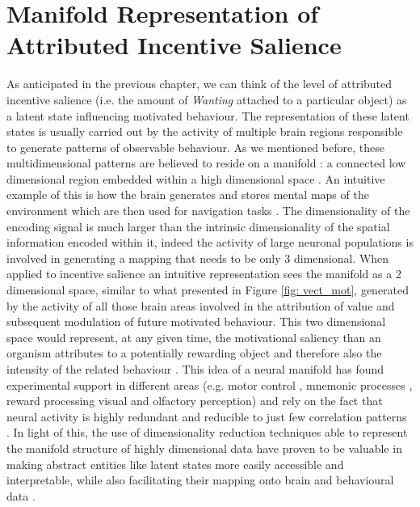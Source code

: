 \section{Manifold Representation of Attributed Incentive Salience}
As anticipated in the previous chapter, we can think of the level of attributed incentive salience (i.e. the amount of \textit{Wanting} attached to a particular object) as a latent state influencing motivated behaviour. The representation of these latent states is usually carried out by the activity of multiple brain regions responsible to generate patterns of observable behaviour. As we mentioned before, these multidimensional patterns are believed to reside on a manifold \cite{seung2000manifold, pang2016dimensionality}: a connected low dimensional region embedded within a high dimensional space \cite{bengio2017deep}. An intuitive example of this is how the brain generates and stores mental maps of the environment which are then used for navigation tasks \cite{derdikman2011manifold, nieh2021geometry}. The dimensionality of the encoding signal is much larger than the intrinsic dimensionality of the spatial information encoded within it, indeed the activity of large neuronal populations is involved in generating a mapping that needs to be only 3 dimensional. When applied to incentive salience an intuitive representation sees the manifold as a 2 dimensional space, similar to what presented in Figure \ref{fig: vect_mot}, generated by the activity of all those brain areas involved in the attribution of value and subsequent modulation of future motivated behaviour. This two dimensional space would represent, at any given time, the motivational saliency than an organism attributes to a potentially rewarding object and therefore also the intensity of the related  behaviour \cite{berridge1998role, simpson2016behavioral}. This idea of a neural manifold has found experimental support in different areas (e.g. motor control \cite{gallego2017neural}, mnemonic processes \cite{derdikman2011manifold, nieh2021geometry}, reward processing \cite{bromberg2010coding} visual \cite{seung2000manifold, ganmor2015thesaurus} and olfactory \cite{stopfer2003intensity} perception) and rely on the fact that neural activity is highly redundant and reducible to just few correlation patterns \cite{gallego2017neural}. In light of this, the use of dimensionality reduction techniques able to represent the manifold structure of highly dimensional data have proven to be valuable in making abstract entities like latent states more easily accessible and interpretable, while also facilitating their mapping onto brain \cite{gao2021nonlinear, rue2021decoding} and behavioural data \cite{luxem2020identifying, pereira2020quantifying, mccullough2021unsupervised, shi2021learning}.

